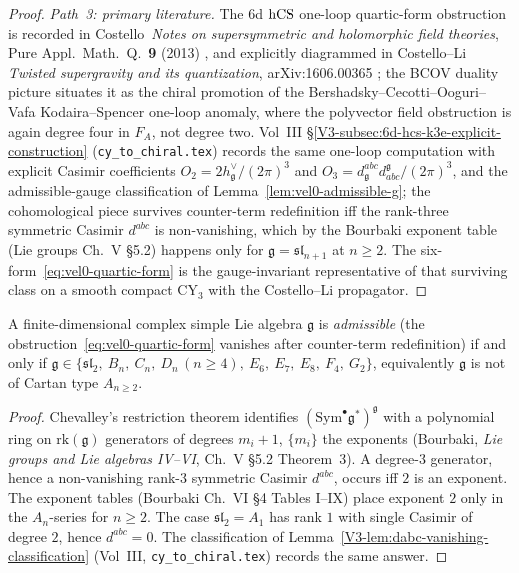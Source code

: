\begin{proof}
\smallskip
\emph{Path~3: primary literature.} The 6d $\mathrm{hCS}$ one-loop quartic-form
obstruction is recorded in Costello~\emph{Notes on supersymmetric and
holomorphic field theories}, Pure Appl.\ Math.\ Q.\ \textbf{9} (2013)
\cite{Costello2013}, and explicitly diagrammed in Costello--Li
\emph{Twisted supergravity and its quantization}, arXiv:1606.00365
\cite{CostelloLi2020}; the BCOV duality picture
\cite{BCOV93} situates it as the chiral promotion of the
Bershadsky--Cecotti--Ooguri--Vafa Kodaira--Spencer one-loop anomaly,
where the polyvector field obstruction is again degree four in
$F_A$, not degree two. Vol~III \S\ref{V3-subsec:6d-hcs-k3e-explicit-construction}
\textup{(}\texttt{cy\_to\_chiral.tex}\textup{)}
records the same one-loop computation with explicit Casimir
coefficients $O_2 = 2 h^\vee_\mathfrak{g}/(2\pi)^3$ and
$O_3 = d^{abc}_\mathfrak{g} d_{abc}^\mathfrak{g}/(2\pi)^3$, and the
admissible-gauge classification of
Lemma~\ref{lem:vel0-admissible-g}; the cohomological piece survives
counter-term redefinition iff the rank-three symmetric Casimir
$d^{abc}$ is non-vanishing, which by the Bourbaki exponent table
\textup{(}Lie groups Ch.~V \S5.2\textup{)} happens only for
$\mathfrak{g} = \mathfrak{sl}_{n+1}$ at $n \geq 2$. The
six-form~\eqref{eq:vel0-quartic-form} is the gauge-invariant
representative of that surviving class on a smooth compact
$\mathrm{CY}_3$ with the Costello--Li propagator.
\end{proof}

\begin{lemma}
\label{lem:vel0-admissible-g}
A finite-dimensional complex simple Lie algebra $\mathfrak{g}$ is
\emph{admissible} (the obstruction~\eqref{eq:vel0-quartic-form}
vanishes after counter-term redefinition) if and only if
$\mathfrak{g} \in \{\mathfrak{sl}_2,\ B_n,\ C_n,\ D_n\,(n \geq 4),\
E_6,\ E_7,\ E_8,\ F_4,\ G_2\}$,
equivalently $\mathfrak{g}$ is not of Cartan type $A_{n \geq 2}$.
\end{lemma}

\begin{proof}
Chevalley's restriction theorem identifies
$(\mathrm{Sym}^\bullet \mathfrak{g}^*)^\mathfrak{g}$ with a polynomial
ring on $\mathrm{rk}(\mathfrak{g})$ generators of degrees
$m_i + 1$, $\{m_i\}$ the exponents (Bourbaki, \emph{Lie groups and
Lie algebras IV--VI}, Ch.~V \S5.2 Theorem~3). A degree-$3$ generator,
hence a non-vanishing rank-$3$ symmetric Casimir $d^{abc}$, occurs iff
$2$ is an exponent. The exponent tables (Bourbaki Ch.~VI \S4 Tables
I--IX) place exponent $2$ only in the $A_n$-series for $n \geq 2$.
The case $\mathfrak{sl}_2 = A_1$ has rank $1$ with single Casimir of
degree $2$, hence $d^{abc} = 0$. The classification of
Lemma~\ref{V3-lem:dabc-vanishing-classification} \textup{(}Vol~III,
\texttt{cy\_to\_chiral.tex}\textup{)} records the same answer.
\end{proof}

